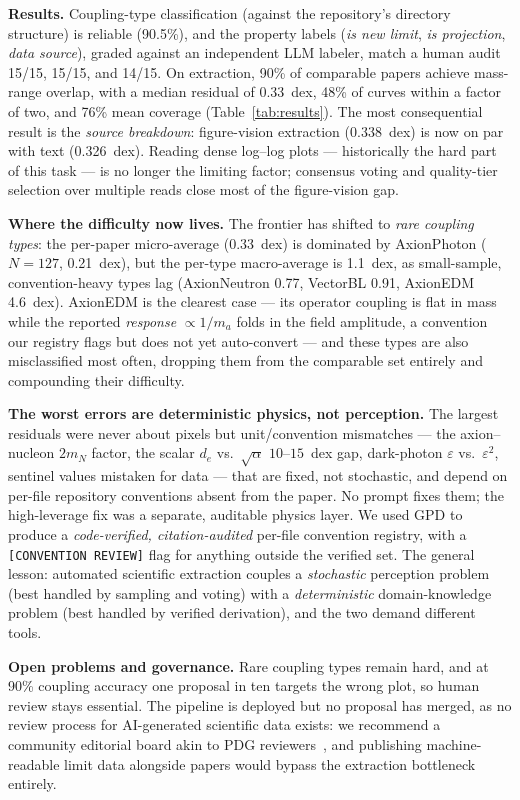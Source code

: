 \documentclass{article}
\begin{document}
\textbf{Results.}
Coupling-type classification (against the repository's directory structure) is reliable (90.5\%), and the property labels (\emph{is new limit}, \emph{is projection}, \emph{data source}), graded against an independent LLM labeler, match a human audit 15/15, 15/15, and 14/15. On extraction, 90\% of comparable papers achieve mass-range overlap, with a median residual of 0.33~dex, 48\% of curves within a factor of two, and 76\% mean coverage (Table~\ref{tab:results}). The most consequential result is the \emph{source breakdown}: figure-vision extraction (0.338~dex) is now on par with text (0.326~dex). Reading dense log--log plots --- historically the hard part of this task --- is no longer the limiting factor; consensus voting and quality-tier selection over multiple reads close most of the figure-vision gap.

\textbf{Where the difficulty now lives.}
The frontier has shifted to \emph{rare coupling types}: the per-paper micro-average (0.33~dex) is dominated by AxionPhoton ($N{=}127$, 0.21~dex), but the per-type macro-average is 1.1~dex, as small-sample, convention-heavy types lag (AxionNeutron 0.77, VectorBL 0.91, AxionEDM 4.6~dex). AxionEDM is the clearest case --- its operator coupling is flat in mass while the reported \emph{response} $\propto 1/m_a$ folds in the field amplitude, a convention our registry flags but does not yet auto-convert --- and these types are also misclassified most often, dropping them from the comparable set entirely and compounding their difficulty.

\textbf{The worst errors are deterministic physics, not perception.}
The largest residuals were never about pixels but unit/convention mismatches --- the axion--nucleon $2m_N$ factor, the scalar $d_e$ vs.\ $\sqrt{\alpha}$ $10$--$15$~dex gap, dark-photon $\varepsilon$ vs.\ $\varepsilon^2$, sentinel values mistaken for data --- that are fixed, not stochastic, and depend on per-file repository conventions absent from the paper. No prompt fixes them; the high-leverage fix was a separate, auditable physics layer. We used GPD to produce a \emph{code-verified, citation-audited} per-file convention registry, with a \texttt{[CONVENTION REVIEW]} flag for anything outside the verified set. The general lesson: automated scientific extraction couples a \emph{stochastic} perception problem (best handled by sampling and voting) with a \emph{deterministic} domain-knowledge problem (best handled by verified derivation), and the two demand different tools.

\textbf{Open problems and governance.}
Rare coupling types remain hard, and at 90\% coupling accuracy one proposal in ten targets the wrong plot, so human review stays essential. The pipeline is deployed but no proposal has merged, as no review process for AI-generated scientific data exists: we recommend a community editorial board akin to PDG reviewers~\cite{pdg}, and publishing machine-readable limit data alongside papers would bypass the extraction bottleneck entirely.
\end{document}

